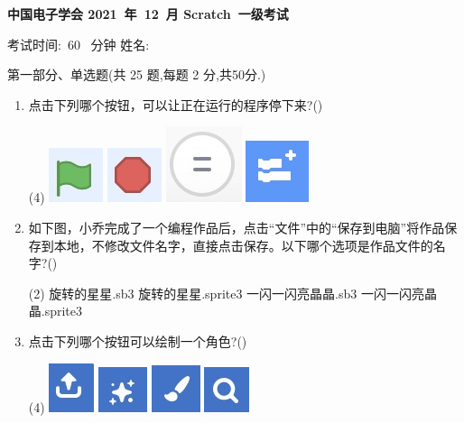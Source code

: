 \documentclass[10pt, a4paper]{article}
\newcommand{\Title}[3]{
    \begin{center}
        \Large \textbf{中国电子学会 #1~年~#2~月 Scratch~#3级考试}
    \end{center}
}
\newcommand{\TimeAndName}[1]{
    \begin{center}
        考试时间:~#1~ 分钟 \qquad\qquad\qquad\qquad 姓名:\underline{\quad\quad\quad\quad}
    \end{center}
}
\begin{document}
    \Title{2021}{12}{一}
    
    \TimeAndName{60}
    
    \vspace{1cm}
    {\noindent\heiti 第一部分、单选题(共 25 题,每题 2 分,共50分.)}

    \begin{enumerate}
        \item 点击下列哪个按钮，可以让正在运行的程序停下来?(\qquad)
        \begin{tasks}(4)
            \task \includegraphics[width=.05\textwidth]{1a.jpg}
            \task \includegraphics[width=.05\textwidth]{1b.jpg}
            \task \includegraphics[width=.05\textwidth]{1c.jpg}
            \task \includegraphics[width=.05\textwidth]{1d.jpg}
        \end{tasks}

        \item 如下图，小乔完成了一个编程作品后，点击“文件”中的“保存到电脑”将作品保存到本地，不修改文件名字，直接点击保存。以下哪个选项是作品文件的名字?(\qquad)
        \begin{tasks}(2)
            \task 旋转的星星.sb3
            \task 旋转的星星.sprite3
            \task 一闪一闪亮晶晶.sb3
            \task 一闪一闪亮晶晶.sprite3
        \end{tasks}

        \item 点击下列哪个按钮可以绘制一个角色?(\qquad)
        \begin{tasks}(4)
            \task \includegraphics[width=.05\textwidth]{3a.jpg}
            \task \includegraphics[width=.05\textwidth]{3b.jpg}
            \task \includegraphics[width=.05\textwidth]{3c.jpg}
            \task \includegraphics[width=.05\textwidth]{3d.jpg}
        \end{tasks}


\end{enumerate}
\end{document}
